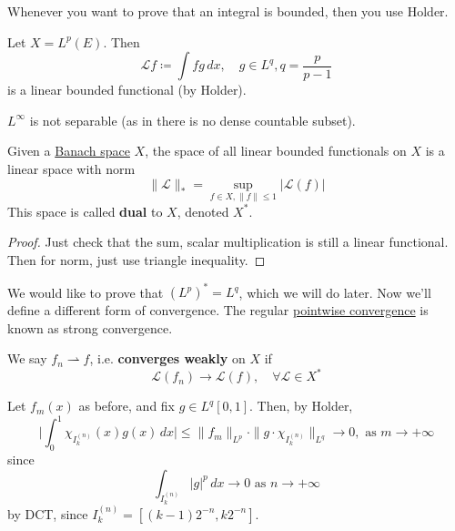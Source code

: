   Whenever you want to prove that an integral is bounded, then you use Holder. 

  \begin{example}
    \label{ex:integration-against-ginlq-as-a-bounded}
    Let $X = L^p (E)$. Then 
    \begin{equation}
      \mathcal{L} f \coloneqq \int f g \,dx, \quad g \in L^q, q = \frac{p}{p - 1}
    \end{equation}
    is a linear bounded functional (by Holder). 
  \end{example}

  $L^\infty$ is not separable (as in there is no dense countable subset). 

  \begin{theorem}
    \label{thm:the-dual-of-a-banach-space}
    Given a \hyperref[mv-def:banach-space]{Banach space} $X$, the space of all linear bounded functionals on $X$ is a linear space with norm 
    \begin{equation}
      \|\mathcal{L}\|_\ast = \sup_{f \in X, \|f\| \leq 1} | \mathcal{L} (f) |
    \end{equation}
    This space is called \textbf{dual} to $X$, denoted $X^\ast$. 
  \end{theorem}
  \begin{proof}
    Just check that the sum, scalar multiplication is still a linear functional. Then for norm, just use triangle inequality. 
  \end{proof}

  We would like to prove that $(L^p)^\ast = L^q$, which we will do later. Now we'll define a different form of convergence. The regular \hyperref[real-def:pointwise-convergence]{pointwise convergence} is known as strong convergence. 

  \begin{definition}
    \label{def:weak-convergence}
    We say $f_n \rightharpoonup f$, i.e. \textbf{converges weakly} on $X$ if 
    \begin{equation}
      \mathcal{L}(f_n) \to \mathcal{L}(f), \quad \forall \mathcal{L} \in X^\ast
    \end{equation}
  \end{definition}

  \begin{example}
    \label{ex:functionals-agreeing-on-a-dense-subset}
    Let $f_m(x)$ as before, and fix $g \in L^q [0, 1]$. Then, by Holder, 
    \begin{equation}
      \bigg| \int_0^1 \chi_{I_k^{(n)}} (x) g(x)\,dx  \bigg| \leq \|f_m\|_{L^p} \cdot \| g \cdot \chi_{I_k^{(n)}}\|_{L^q} \to 0, \text{ as } m \to +\infty
    \end{equation}
    since 
    \begin{equation}
      \int_{I_k^{(n)}} |g|^p \,dx \to 0 \text{ as } n \to +\infty
    \end{equation}
    by DCT, since $I_k^{(n)} = [(k-1) 2^{-n}, k 2^{-n}]$. 
  \end{example}

